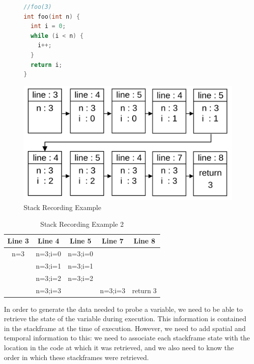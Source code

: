 \documentclass[english,submission]{programming}
\begin{document}
\begin{figure}[h]
  \centering
  \begin{minipage}{0.25\textwidth}
    \centering
    \begin{lstlisting}[language=C]
//foo(3)
int foo(int n) {
  int i = 0;
  while (i < n) {
    i++;
  }
  return i;
}
    \end{lstlisting}
  \end{minipage}
  \hfill
  \begin{minipage}{0.7\textwidth}
    \centering
    \includegraphics[width=0.8\linewidth]{img/stackrecording_chain.png}
  \end{minipage}
  \caption{Stack Recording Example}
  \label{fig:stack-recording}
\end{figure}

\begin{table}[ht]
  \centering
  \begin{tabular}{|c|c|c|c|c|}
  \hline
      \textbf{Line 3} & \textbf{Line 4} & \textbf{Line 5} & \textbf{Line 7} & \textbf{Line 8} \\ \hline
      n=3 & n=3;i=0 & n=3;i=0 & ~ & ~ \\ \hline
      ~ & n=3;i=1 & n=3;i=1 & ~ & ~ \\ \hline
      ~ & n=3;i=2 & n=3;i=2 & ~ & ~ \\ \hline
      ~ & n=3;i=3 & ~ & n=3;i=3 & return 3 \\ \hline
  \end{tabular}
  \label{tab:stack-recording}
  \caption{Stack Recording Example 2}
\end{table}

In order to generate the data needed to probe a variable, we need to be able to retrieve the state of the variable during execution. 
This information is contained in the stackframe at the time of execution. 
However, we need to add spatial and temporal information to this: we need to associate each stackframe state with the location in the code at which it was retrieved, and we also need to know the order in which these stackframes were retrieved.
\end{document}
